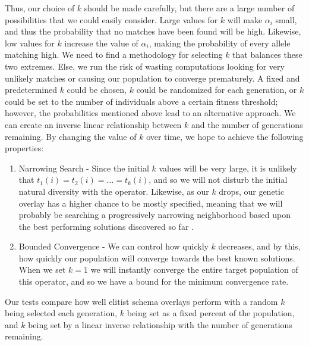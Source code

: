 Thus, our choice of $k$ should be made carefully, but there are a large number of possibilities that we could easily consider. Large values for $k$ will make $\alpha_i$ small, and thus the probability that no matches have been found will be high. Likewise, low values for $k$ increase the value of $\alpha_i$, making the probability of every allele matching high. We need to find a methodology for selecting $k$ that balances these two extremes. Else, we run the risk of wasting computations looking for very unlikely matches or causing our population to converge prematurely. A fixed and predetermined $k$ could be chosen, $k$ could be randomized for each generation, or $k$ could be set to the number of individuals above a certain fitness threshold; however, the probabilities mentioned above lead to an alternative approach. We can create an inverse linear relationship between $k$ and the number of generations remaining. By changing the value of $k$ over time, we hope to achieve the following properties:

\begin{enumerate}

\item Narrowing Search - Since the initial $k$ values will be very large, it is unlikely that $t_1(i) = t_2(i) = \ldots = t_k(i)$, and so we will not disturb the initial natural diversity with the operator.  Likewise, as our $k$ drops, our genetic overlay has a higher chance to be mostly specified, meaning that we will probably be searching a progressively narrowing neighborhood based upon the best performing solutions discovered so far \cite{Neri11}.

\item Bounded Convergence - We can control how quickly $k$ decreases, and by this, how quickly our population will converge towards the best known solutions. When we set $k=1$ we will instantly converge the entire target population of this operator, and so we have a bound for the minimum convergence rate.

\end{enumerate}

Our tests compare how well elitist schema overlays perform with a random $k$ being selected each generation, $k$ being set as a fixed percent of the population, and $k$ being set by a linear inverse relationship with the number of generations remaining.

%
%
%
